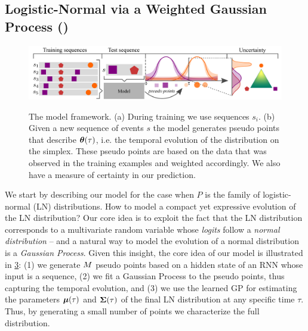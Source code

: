 \subsection{Logistic-Normal via a Weighted Gaussian Process (\GPModel)}
\label{GP}

\begin{figure}
	\centering
	\includegraphics[width=\linewidth]{sections/010_neurips2019/paper/images/model_schema.pdf}
	\begin{subfigure}{0.3\textwidth}
		\caption{} \label{fig:model_illustration_1}
	\end{subfigure}
	\begin{subfigure}{0.69\textwidth}
		\caption{} \label{fig:model_illustration_2}
	\end{subfigure}
	\vspace*{-0.5cm}
    \caption{The model framework. (a) During training we use sequences $s_i$. (b) Given a new sequence of events $s$ the model generates pseudo points that describe $\bm{\theta}(\tau)$, i.e. the temporal evolution of the distribution on the simplex. These pseudo points are based on the data that was observed in the training examples and weighted accordingly. We also have a measure of certainty in our prediction.}\label{fig:model_illustration}
    \vspace*{-0.5cm}
\end{figure}

We start by describing our model for the case when $P$ is the family of logistic-normal (LN) distributions.
How to model a compact yet expressive evolution of the LN distribution?
Our core idea is to exploit the fact that the LN distribution corresponds to a multivariate random variable whose \textit{logits} follow a \textit{normal distribution} -- and a natural way to model the evolution of a normal distribution is a \textit{Gaussian Process}. Given this insight, the core idea of our model is illustrated in \cref{fig:model_illustration}: (1) we generate $M$ pseudo points based on a hidden state of an RNN whose input is a sequence, (2) we fit a Gaussian Process to the pseudo points, thus capturing the temporal evolution, and (3) we use the learned GP for estimating the parameters $\bm \mu(\tau)$ and $\bm \Sigma(\tau)$ of the final LN distribution at any specific time $\tau$. Thus, by generating a small number of points we characterize the full distribution.

